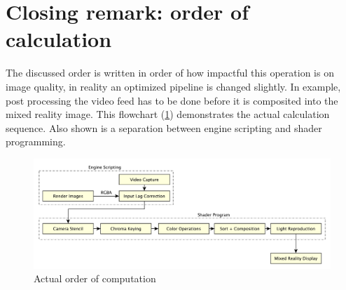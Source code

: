 %
\section{Closing remark: order of calculation}

The discussed order is written in order of how impactful this operation is on 
image quality, in reality an optimized pipeline is changed slightly. In 
example, post processing the video feed has to be done before it is composited 
into the mixed reality image. This flowchart (\ref{fig:steps:order:alt}) 
demonstrates the actual calculation sequence. Also shown is a separation 
between engine scripting and shader programming.

\begin{figure}[htb]
	\includegraphics[width=\textwidth]{_raw_resources/pipeline_steps/4_9_order_alt.pdf}
	\caption{Actual order of computation}
	\label{fig:steps:order:alt}
\end{figure}

